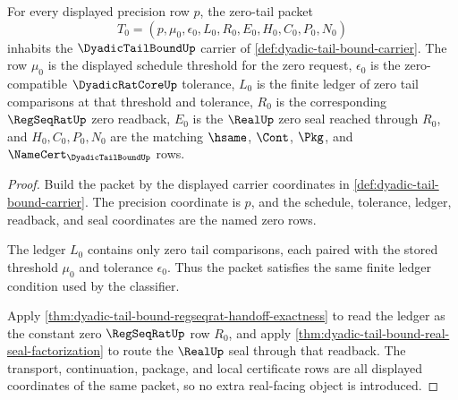\begin{theorem}
\label{thm:dyadic-tail-bound-zero-packet-carrier}
For every displayed precision row $p$, the zero-tail packet
$$
T_0=(p,\mu_0,\epsilon_0,L_0,R_0,E_0,H_0,C_0,P_0,N_0)
$$
inhabits the $\DyadicTailBoundUp$ carrier of \autoref{def:dyadic-tail-bound-carrier}. The row $\mu_0$ is the displayed schedule threshold for the zero request, $\epsilon_0$ is the zero-compatible $\DyadicRatCoreUp$ tolerance, $L_0$ is the finite ledger of zero tail comparisons at that threshold and tolerance, $R_0$ is the corresponding $\RegSeqRatUp$ zero readback, $E_0$ is the $\RealUp$ zero seal reached through $R_0$, and $H_0,C_0,P_0,N_0$ are the matching $\hsame$, $\Cont$, $\Pkg$, and $\NameCert_{\DyadicTailBoundUp}$ rows.
\end{theorem}
\begin{proof}
Build the packet by the displayed carrier coordinates in \autoref{def:dyadic-tail-bound-carrier}. The precision coordinate is $p$, and the schedule, tolerance, ledger, readback, and seal coordinates are the named zero rows.

The ledger $L_0$ contains only zero tail comparisons, each paired with the stored threshold $\mu_0$ and tolerance $\epsilon_0$. Thus the packet satisfies the same finite ledger condition used by the classifier.

Apply \autoref{thm:dyadic-tail-bound-regseqrat-handoff-exactness} to read the ledger as the constant zero $\RegSeqRatUp$ row $R_0$, and apply \autoref{thm:dyadic-tail-bound-real-seal-factorization} to route the $\RealUp$ seal through that readback. The transport, continuation, package, and local certificate rows are all displayed coordinates of the same packet, so no extra real-facing object is introduced.
\end{proof}

